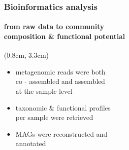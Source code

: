 \documentclass{beamer}
\begin{document}
\begin{frame}
\begin{textblock*}{6cm}
      \end{textblock*}

   \end{frame}

   \begin{frame}
      \frametitle{Bioinformatics analysis}
      \framesubtitle{from raw data to community \\ composition \& functional potential}


      \begin{textblock*}{6cm}(0.8cm, 3.3cm)
         \small 

         \begin{itemize}

            \item metagenomic reads were both \\
            co - assembled and assembled \\
            at the sample level 
            \item taxonomic \& functional profiles \\
            per sample were retrieved \\ 
            \item MAGs were reconstructed and \\
            annotated


\end{itemize}
\end{textblock*}
\end{frame}
\end{document}
